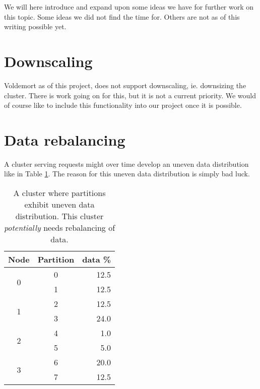 
We will here introduce and expand upon some ideas we have for further work on this topic. Some ideas we did not find the time for. Others are not as of this writing possible yet.

\section{Downscaling}
Voldemort as of this project, does not support downscaling, ie. downsizing the cluster. There is work going on for this, but it is not a current priority. We would of course like to include this functionality into our project once it is possible.

\section{Data rebalancing}
A cluster serving requests might over time develop an uneven data distribution like in Table \ref{tbl:datarebalance}. The reason for this uneven data distribution is simply bad luck. 

\begin{center}
\begin{table}[h]
	\begin{tabular}{|c|c|r|}

		\multicolumn{1}{c}{Node} & 
		\multicolumn{1}{c}{Partition } & 
		\multicolumn{1}{c}{data \%} \\
		\hline

		\multirow{2}{*}{0} & 0 & 12.5 \\ \cline{2-3}
		 & 1 & 12.5 \\
		 \hline
		\multirow{2}{*}{1} & 2 & 12.5 \\ \cline{2-3}
		 & 3 & 24.0 \\
 		 \hline

		\multirow{2}{*}{2} & 4 & 1.0 \\ \cline{2-3}
		 & 5 & 5.0 \\
		
		\hline	
		
		\multirow{2}{*}{3} & 6 & 20.0 \\ \cline{2-3}
		 & 7 & 12.5 \\

		\hline
	\end{tabular}
	\caption{A cluster where partitions exhibit uneven data distribution. This cluster \emph{potentially} needs rebalancing of data.}
	\label{tbl:datarebalance}
\end{table}
\end{center}

